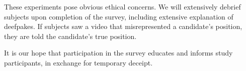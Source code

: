 These experiments pose obvious ethical concerns. We will extensively
debrief subjects upon completion of the survey, including extensive
explanation of deefpakes. If subjects saw a video that misrepresented
a candidate's position, they are told the candidate's true position.

It is our hope that participation in the survey educates and informs
study participants, in exchange for temporary deceipt.
